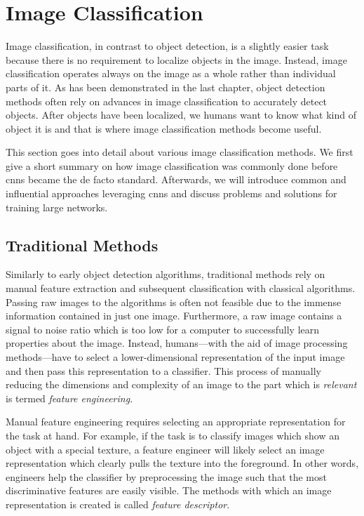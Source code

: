 \documentclass[final]{vutinfth} %
\begin{document}
\section{Image Classification}
\label{sec:background-classification}

Image classification, in contrast to object detection, is a slightly
easier task because there is no requirement to localize objects in the
image. Instead, image classification operates always on the image as a
whole rather than individual parts of it. As has been demonstrated in
the last chapter, object detection methods often rely on advances in
image classification to accurately detect objects. After objects have
been localized, we humans want to know what kind of object it is and
that is where image classification methods become useful.

This section goes into detail about various image classification
methods. We first give a short summary on how image classification was
commonly done before \glspl{cnn} became the de facto
standard. Afterwards, we will introduce common and influential
approaches leveraging \glspl{cnn} and discuss problems and solutions
for training large networks.

\subsection{Traditional Methods}
\label{ssec:class-traditional}

Similarly to early object detection algorithms, traditional methods
rely on manual feature extraction and subsequent classification with
classical algorithms. Passing raw images to the algorithms is often
not feasible due to the immense information contained in just one
image. Furthermore, a raw image contains a signal to noise ratio which
is too low for a computer to successfully learn properties about the
image. Instead, humans—with the aid of image processing methods—have
to select a lower-dimensional representation of the input image and
then pass this representation to a classifier. This process of
manually reducing the dimensions and complexity of an image to the
part which is \emph{relevant} is termed \emph{feature engineering}.

Manual feature engineering requires selecting an appropriate
representation for the task at hand. For example, if the task is to
classify images which show an object with a special texture, a feature
engineer will likely select an image representation which clearly
pulls the texture into the foreground. In other words, engineers help
the classifier by preprocessing the image such that the most
discriminative features are easily visible. The methods with which an
image representation is created is called \emph{feature descriptor}.
\end{document}
